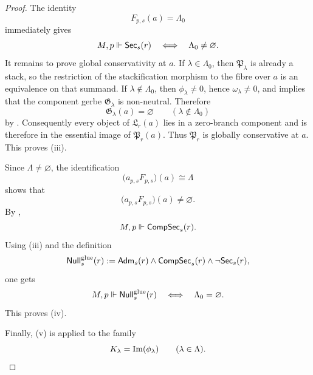 \begin{proof}
The identity
\[
F_{p,s}(a)=\Lambda_0
\]
immediately gives
\[
M,p\Vdash \mathsf{Sec}_s(r)
\quad\Longleftrightarrow\quad
\Lambda_0\neq\varnothing.
\]
It remains to prove global conservativity at $a$. If $\lambda\in\Lambda_0$, then $\mathfrak P_\lambda$ is already a stack, so the restriction of the stackification morphism to the fibre over $a$ is an equivalence on that summand. If $\lambda\notin\Lambda_0$, then $\phi_\lambda\neq 0$, hence $\omega_\lambda\neq 0$, and  implies that the component gerbe $\mathfrak G_\lambda$ is non-neutral. Therefore
\[
\mathfrak G_\lambda(a)=\varnothing
\qquad
(\lambda\notin\Lambda_0)
\]
by . Consequently every object of $\mathfrak L_r(a)$ lies in a zero-branch component and is therefore in the essential image of $\mathfrak P_r(a)$. Thus $\mathfrak P_r$ is globally conservative at $a$. This proves \textup{(iii)}.

Since $\Lambda\neq\varnothing$, the identification
\[
\bigl(a_{p,s}F_{p,s}\bigr)(a)\cong \Lambda
\]
shows that
\[
\bigl(a_{p,s}F_{p,s}\bigr)(a)\neq\varnothing.
\]
By ,
\[
M,p\Vdash \mathsf{CompSec}_s(r).
\]
Using \textup{(iii)} and the definition
\[
\mathsf{Null}^{\mathrm{glue}}_s(r):=\mathsf{Adm}_s(r)\land \mathsf{CompSec}_s(r)\land \neg\mathsf{Sec}_s(r),
\]
one gets
\[
M,p\Vdash \mathsf{Null}^{\mathrm{glue}}_s(r)
\quad\Longleftrightarrow\quad
\Lambda_0=\varnothing.
\]
This proves \textup{(iv)}.

Finally, \textup{(v)} is  applied to the family
\[
K_\lambda=\operatorname{Im}(\phi_\lambda)
\qquad
(\lambda\in\Lambda).
\qedhere
\]
\end{proof}

